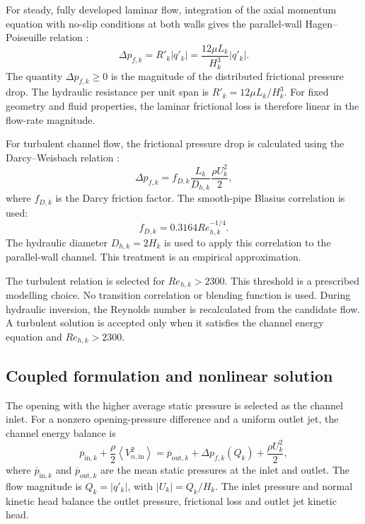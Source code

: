 \documentclass[a4paper,fleqn]{cas-dc}
\begin{document}
For steady, fully developed laminar flow, integration
of the axial momentum equation with no-slip conditions
at both walls gives the parallel-wall Hagen--Poiseuille
relation \cite{ShahLondon1978LaminarDucts}:
\begin{equation}
	\Delta p_{f,k}
	=
	R'_k |q'_k|
	=
	\frac{12\mu L_k}{H_k^3}|q'_k|.
	\label{eq:laminar_pressure_flow}
\end{equation}
The quantity $\Delta p_{f,k}\geq0$ is the magnitude
of the distributed frictional pressure drop.
The hydraulic resistance per unit span is
$R'_k=12\mu L_k/H_k^3$.
For fixed geometry and fluid properties, the laminar
frictional loss is therefore linear in the flow-rate
magnitude.

For turbulent channel flow, the frictional pressure drop
is calculated using the Darcy--Weisbach relation
\cite{Moody1944FrictionFactors}:
\begin{equation}
	\Delta p_{f,k}
	=
	f_{D,k}
	\frac{L_k}{D_{h,k}}
	\frac{\rho U_k^2}{2},
	\label{eq:friction_drop}
\end{equation}
where $f_{D,k}$ is the Darcy friction factor.
The smooth-pipe Blasius correlation is used:
\begin{equation}
	f_{D,k}
	=
	0.3164Re_{h,k}^{-1/4}.
	\label{eq:channel_friction_factor}
\end{equation}
The hydraulic diameter $D_{h,k}=2H_k$ is used to apply
this correlation to the parallel-wall channel.
This treatment is an empirical approximation.

The turbulent relation is selected for $Re_{h,k}>2300$.
This threshold is a prescribed modelling choice.
No transition correlation or blending function is used.
During hydraulic inversion, the Reynolds number is
recalculated from the candidate flow.
A turbulent solution is accepted only when it satisfies
the channel energy equation and $Re_{h,k}>2300$.

\subsection{Coupled formulation and nonlinear solution}
\label{subsec:coupled_solution}

The opening with the higher average static pressure is selected as the channel inlet.
For a nonzero opening-pressure difference and a uniform outlet jet, the channel energy balance is
\begin{equation}
	\overline{p}_{\mathrm{in},k}
	+\frac{\rho}{2}
	\left\langle V_{n,\mathrm{in}}^2\right\rangle
	=
	\overline{p}_{\mathrm{out},k}
	+\Delta p_{f,k}(Q_k)
	+\frac{\rho U_k^2}{2},
	\label{eq:channel_energy_equation}
\end{equation}
where $\overline{p}_{\mathrm{in},k}$ and $\overline{p}_{\mathrm{out},k}$ are the mean static pressures at the inlet and outlet.
The flow magnitude is $Q_k=|q'_k|$, with $|U_k|=Q_k/H_k$.
The inlet pressure and normal kinetic head balance the outlet pressure, frictional loss and outlet jet kinetic head.
\end{document}
